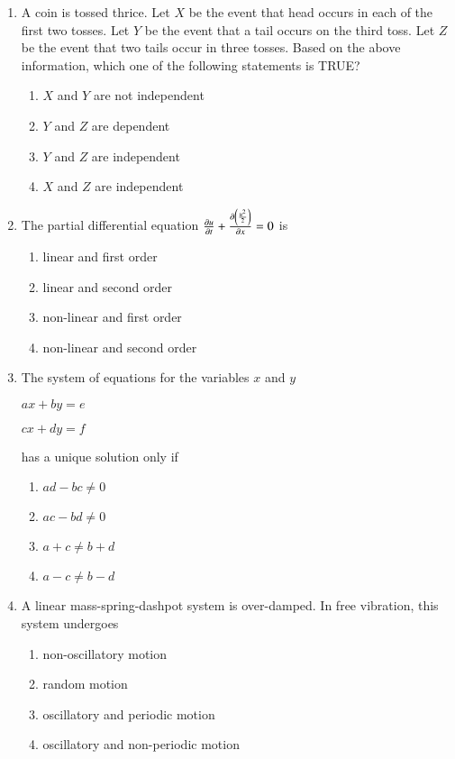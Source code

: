 \documentclass[journal]{IEEEtran}
\begin{document}
\begin{enumerate}
\item A coin is tossed thrice. Let $X$ be the event that head occurs in each of the first two tosses. Let $Y$ be the event that a tail occurs on the third toss. Let $Z$ be the event that two tails occur in three tosses. Based on the above information, which one of the following statements is TRUE?
\begin{multicols}{2}
\begin{enumerate}
\item $X$ and $Y$ are not independent
\item $Y$ and $Z$ are dependent
\item $Y$ and $Z$ are independent
\item $X$ and $Z$ are independent
\end{enumerate}
\end{multicols}


\item The partial differential equation $\frac{\partial u}{\partial t}+\frac{\partial\left(\frac{u^{2}}{2}\right)}{\partial x}=0$ is
\begin{multicols}{2}
\begin{enumerate}
\item linear and first order
\item linear and second order
\item non-linear and first order
\item non-linear and second order
\end{enumerate}
\end{multicols}


\item The system of equations for the variables $x$ and $y$

$ax+by=e$

$cx+dy=f$

has a unique solution only if
\begin{multicols}{2}
\begin{enumerate}
\item $ad-bc\neq 0$
\item $ac-bd\neq 0$
\item $a+c\neq b+d$
\item $a-c\neq b-d$
\end{enumerate}
\end{multicols}


\item A linear mass-spring-dashpot system is over-damped. In free vibration, this system undergoes
\begin{multicols}{2}
\begin{enumerate}
\item non-oscillatory motion
\item random motion
\item oscillatory and periodic motion
\item oscillatory and non-periodic motion
\end{enumerate}
\end{multicols}
\end{enumerate}
\end{document}
